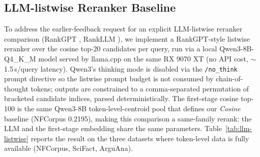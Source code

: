 \documentclass[review,1p]{elsarticle}
\begin{document}
\begin{table}[h]
\centering
\small
\caption{Adaptive $\lambda$ strategies across five BEIR corpora, NDCG@10 on the held-out test half (50/50 split, 5-seed mean). Macro is the unweighted mean across the five corpora. Ridge-4 (linear baseline) and GBM-11 (gradient-boosted, 11 features) adds non-linear regression on richer signals (token/lap NDCG margins, lap T-sweep variance, signal disagreement). GBM-11 closes $2.6\times$ of the Ridge-4-to-oracle gap (Ridge-4 gap $13.5\%$ rel; GBM-11 gap $5.17\%$ rel). Oracle is the upper bound from selecting the best $\lambda$ per query a posteriori. Implementation: \texttt{benchmark/adaptive\_fusion\_lambda\_v2.py}; results: \texttt{adaptive\_lambda\_v2\_gbm\_results.json}.}
\label{tab:adaptive-lambda}
\footnotesize
{}
\end{table}

\subsection{LLM-listwise Reranker Baseline}
\label{subsec:llm-listwise}

To address the earlier-feedback request for an explicit LLM-listwise reranker comparison (RankGPT \citep{sun2024rankgpt}, RankLLM \citep{pradeep2025rankllm}), we implement a RankGPT-style listwise reranker over the cosine top-20 candidates per query, run via a local Qwen3-8B-Q4\_K\_M model served by llama.cpp on the same RX 9070 XT (no API cost, $\sim$1.5\,s/query latency). Qwen3's thinking mode is disabled via the \texttt{/no\_think} prompt directive so the listwise prompt budget is not consumed by chain-of-thought tokens; outputs are constrained to a comma-separated permutation of bracketed candidate indices, parsed deterministically. The first-stage cosine top-100 is the same Qwen3-8B token-level-centroid pool that defines our \emph{Cosine} baseline (NFCorpus 0.2195), making this comparison a same-family rerank: the LLM and the first-stage embedding share the same parameters. Table~\ref{tab:llm-listwise} reports the result on the three datasets where token-level data is fully available (NFCorpus, SciFact, ArguAna).
\end{document}
